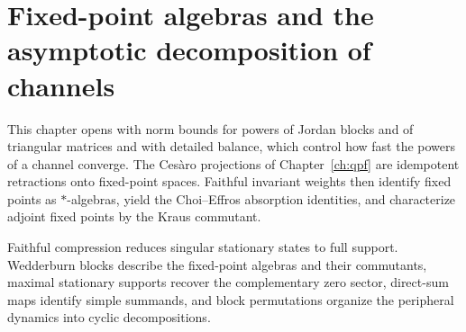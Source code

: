 \chapter{Fixed-point algebras and the asymptotic decomposition of channels}
\label{ch:channel_asymptotics}

This chapter opens with norm bounds for powers of Jordan blocks and of
triangular matrices and with detailed balance, which control how fast the
powers of a channel converge. The Ces\`aro projections of
Chapter~\ref{ch:qpf} are idempotent retractions onto fixed-point
spaces. Faithful invariant weights then identify fixed points as
$*$-algebras, yield the Choi--Effros absorption identities, and characterize
adjoint fixed points by the Kraus commutant.

Faithful compression reduces singular stationary states to full support.
Wedderburn blocks describe the fixed-point algebras and their commutants,
maximal stationary supports recover the complementary zero sector, direct-sum
maps identify simple summands, and block permutations organize the peripheral
dynamics into cyclic decompositions.












